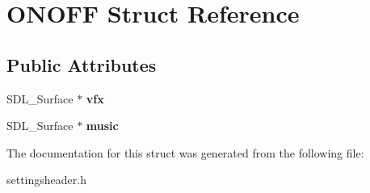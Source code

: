 \hypertarget{structONOFF}{}\section{O\+N\+O\+FF Struct Reference}
\label{structONOFF}
\subsection*{Public Attributes}
\begin{DoxyCompactItemize}
\item 
S\+D\+L\+\_\+\+Surface $\ast$ {\bfseries vfx}\hypertarget{structONOFF_accf175fde24a4e9a1daa80cfd5b13037}{}\label{structONOFF_accf175fde24a4e9a1daa80cfd5b13037}

\item 
S\+D\+L\+\_\+\+Surface $\ast$ {\bfseries music}\hypertarget{structONOFF_a33a702d99840510e4fef4b7f0860a4e4}{}\label{structONOFF_a33a702d99840510e4fef4b7f0860a4e4}

\end{DoxyCompactItemize}


The documentation for this struct was generated from the following file\+:\begin{DoxyCompactItemize}
\item 
settingsheader.\+h\end{DoxyCompactItemize}
